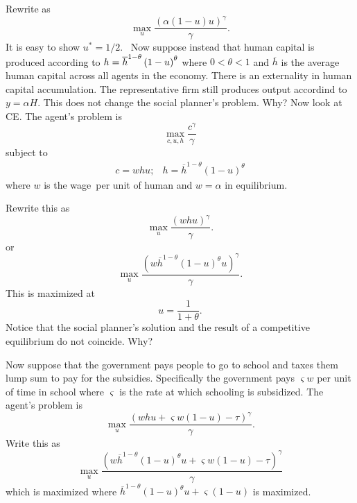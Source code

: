 \documentclass{sebase}
\begin{document}
Rewrite as%
\begin{equation*}
\underset{u}{\max }\frac{\left( \alpha (1-u)u\right) ^{\gamma }}{\gamma }.
\end{equation*}%
It is easy to show $u^{\ast }=1/2$.\ \newline
Now suppose instead that human capital is produced according to $h=\overline{%
h}^{1-\theta }\left( 1-u\right) ^{\theta }$ where $0<\theta <1$ and $%
\overline{h}$ is the average human capital across all agents in the economy.
There is an externality in human capital accumulation. The representative
firm still produces output accordind to $y=\alpha H.$ This does not change
the social planner's problem. Why? Now look at CE. The agent's problem is%
\begin{equation*}
\underset{c,u,h}{\max }\frac{c^{\gamma }}{\gamma }
\end{equation*}%
subject to 
\begin{equation*}
\begin{array}{ll}
c=whu; & h=\overline{h}^{1-\theta }\left( 1-u\right) ^{\theta }%
\end{array}%
\end{equation*}%
where $w$ is the wage\ per unit of human and $w=\alpha $ in
equilibrium.\pagebreak

Rewrite this as%
\begin{equation*}
\underset{u}{\max }\frac{\left( whu\right) ^{\gamma }}{\gamma }.
\end{equation*}%
or%
\begin{equation*}
\underset{u}{\max }\frac{\left( w\overline{h}^{1-\theta }(1-u)^{\theta
}u\right) ^{\gamma }}{\gamma }.
\end{equation*}%
This is maximized at 
\begin{equation*}
u=\frac{1}{1+\theta }.
\end{equation*}%
Notice that the social planner's solution and the result of a competitive
equilibrium do not coincide. Why? \pagebreak

Now suppose that the government pays people to go to school and taxes them
lump sum to pay for the subsidies. Specifically the government pays $%
\varsigma w$ per unit of time in school where $\varsigma $ is the rate at
which schooling is subsidized$.$ The agent's problem is 
\begin{equation*}
\underset{u}{\max }\frac{\left( whu+\varsigma w(1-u)-\tau \right) ^{\gamma }%
}{\gamma }.
\end{equation*}%
Write this as%
\begin{equation*}
\underset{u}{\max }\frac{\left( w\overline{h}^{1-\theta }(1-u)^{\theta
}u+\varsigma w(1-u)-\tau \right) ^{\gamma }}{\gamma }
\end{equation*}%
which is maximized where $\overline{h}^{1-\theta }(1-u)^{\theta }u+\varsigma
(1-u)$ is maximized. \pagebreak
\end{document}
